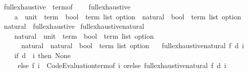 \begin{isabellebody}
\isanewline
{}\isamarkupfalse%
\ full{\isacharunderscore}{\kern0pt}exhaustive\ {\isacharequal}{\kern0pt}\ term{\isacharunderscore}{\kern0pt}of\ {\isacharplus}{\kern0pt}\isanewline
\ \ \ full{\isacharunderscore}{\kern0pt}exhaustive\ {\isacharcolon}{\kern0pt}{\isacharcolon}{\kern0pt}\isanewline
\ \ \ \ {\isachardoublequoteopen}{\isacharparenleft}{\kern0pt}{\isacharprime}{\kern0pt}a\ {\isasymtimes}\ {\isacharparenleft}{\kern0pt}unit\ {\isasymRightarrow}\ term{\isacharparenright}{\kern0pt}\ {\isasymRightarrow}\ {\isacharparenleft}{\kern0pt}bool\ {\isasymtimes}\ term\ list{\isacharparenright}{\kern0pt}\ option{\isacharparenright}{\kern0pt}\ {\isasymRightarrow}\ natural\ {\isasymRightarrow}\ {\isacharparenleft}{\kern0pt}bool\ {\isasymtimes}\ term\ list{\isacharparenright}{\kern0pt}\ option{\isachardoublequoteclose}\isanewline
\isanewline
{}\isamarkupfalse%
\ natural\ {\isacharcolon}{\kern0pt}{\isacharcolon}{\kern0pt}\ full{\isacharunderscore}{\kern0pt}exhaustive\isanewline
{}\isanewline
\isanewline
{}\isamarkupfalse%
\ full{\isacharunderscore}{\kern0pt}exhaustive{\isacharunderscore}{\kern0pt}natural{\isacharprime}{\kern0pt}\ {\isacharcolon}{\kern0pt}{\isacharcolon}{\kern0pt}\isanewline
\ \ \ \ {\isachardoublequoteopen}{\isacharparenleft}{\kern0pt}natural\ {\isasymtimes}\ {\isacharparenleft}{\kern0pt}unit\ {\isasymRightarrow}\ term{\isacharparenright}{\kern0pt}\ {\isasymRightarrow}\ {\isacharparenleft}{\kern0pt}bool\ {\isasymtimes}\ term\ list{\isacharparenright}{\kern0pt}\ option{\isacharparenright}{\kern0pt}\ {\isasymRightarrow}\isanewline
\ \ \ \ \ \ natural\ {\isasymRightarrow}\ natural\ {\isasymRightarrow}\ {\isacharparenleft}{\kern0pt}bool\ {\isasymtimes}\ term\ list{\isacharparenright}{\kern0pt}\ option{\isachardoublequoteclose}\isanewline
\ \ \ {\isachardoublequoteopen}full{\isacharunderscore}{\kern0pt}exhaustive{\isacharunderscore}{\kern0pt}natural{\isacharprime}{\kern0pt}\ f\ d\ i\ {\isacharequal}{\kern0pt}\isanewline
\ \ \ \ {\isacharparenleft}{\kern0pt}if\ d\ {\isacharless}{\kern0pt}\ i\ then\ None\isanewline
\ \ \ \ \ else\ {\isacharparenleft}{\kern0pt}f\ {\isacharparenleft}{\kern0pt}i{\isacharcomma}{\kern0pt}\ {\isasymlambda}{\isacharunderscore}{\kern0pt}{\isachardot}{\kern0pt}\ Code{\isacharunderscore}{\kern0pt}Evaluation{\isachardot}{\kern0pt}term{\isacharunderscore}{\kern0pt}of\ i{\isacharparenright}{\kern0pt}{\isacharparenright}{\kern0pt}\ orelse\ {\isacharparenleft}{\kern0pt}full{\isacharunderscore}{\kern0pt}exhaustive{\isacharunderscore}{\kern0pt}natural{\isacharprime}{\kern0pt}\ f\ d\ {\isacharparenleft}{\kern0pt}i\ {\isacharplus}{\kern0pt}\ {}{\isacharparenright}{\kern0pt}{\isacharparenright}{\kern0pt}{\isacharparenright}{\kern0pt}{\isachardoublequoteclose}\isanewline

\end{isabellebody}
